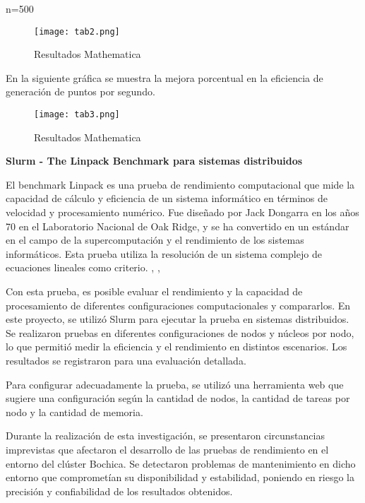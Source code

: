 \begin{spacing}{1.5}
      n=500

      \begin{figure}[h]
            \centering
            \texttt{[image: tab2.png]}
            \caption{Resultados Mathematica}
            \label{fig:etiqueta}
      \end{figure}

      En la siguiente gráfica se muestra la mejora porcentual en la eficiencia de generación de puntos por segundo.

      \begin{figure}[h]
            \centering
            \texttt{[image: tab3.png]}
            \caption{Resultados Mathematica}
            \label{fig:etiqueta}
      \end{figure}

\textbf{Slurm - The Linpack Benchmark para sistemas distribuidos}

El benchmark Linpack es una prueba de rendimiento computacional que mide la capacidad de cálculo y eficiencia de un sistema informático en términos de velocidad y procesamiento numérico. Fue diseñado por Jack Dongarra en los años 70 en el Laboratorio Nacional de Oak Ridge, y se ha convertido en un estándar en el campo de la supercomputación y el rendimiento de los sistemas informáticos. Esta prueba utiliza la resolución de un sistema complejo de ecuaciones lineales como criterio. \cite{linpack}, \cite{hpl-linpack}, \cite{faq-linpack}

Con esta prueba, es posible evaluar el rendimiento y la capacidad de procesamiento de diferentes configuraciones computacionales y compararlos. En este proyecto, se utilizó Slurm para ejecutar la prueba en sistemas distribuidos. Se realizaron pruebas en diferentes configuraciones de nodos y núcleos por nodo, lo que permitió medir la eficiencia y el rendimiento en distintos escenarios. Los resultados se registraron para una evaluación detallada.

Para configurar adecuadamente la prueba, se utilizó una herramienta web que sugiere una configuración según la cantidad de nodos, la cantidad de tareas por nodo y la cantidad de memoria. \cite{tune-hpl-dat-file}

Durante la realización de esta investigación, se presentaron circunstancias imprevistas que afectaron el desarrollo de las pruebas de rendimiento en el entorno del clúster Bochica. Se detectaron problemas de mantenimiento en dicho entorno que comprometían su disponibilidad y estabilidad, poniendo en riesgo la precisión y confiabilidad de los resultados obtenidos.


\end{spacing}
